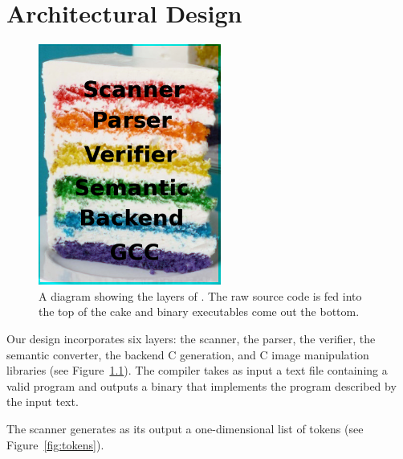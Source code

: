 \chapter{Architectural Design}




\begin{figure}
\begin{center}
\includegraphics[width=60mm]{figures/layers.png}
\caption{A diagram showing the layers of \sys{}. The raw source code is
fed into the top of the cake and binary executables come out the bottom.}
\label{fig:layers}
\end{center}
\end{figure}

Our design incorporates six layers: the scanner, the parser, the verifier,
the semantic converter, the backend C generation, and C image manipulation
libraries (see Figure~\ref{fig:layers}). The compiler takes as input
a text file containing a valid \sys{} program and outputs a binary that
implements the program described by the input text.

The scanner generates as its output a one-dimensional list of
tokens (see Figure~\ref{fig:tokens}).


